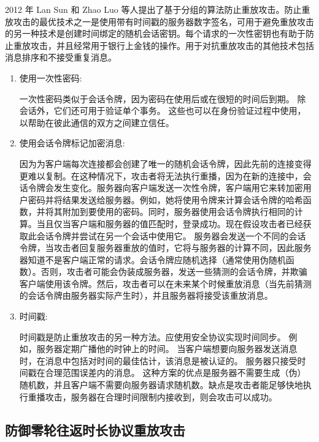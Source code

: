 2012 年 Lan Sun 和 Zhao Luo 等人\cite{6295193}提出了基于分组的算法防止重放攻击。防止重放攻击的最优技术之一是使用带有时间戳的服务器数字签名，可用于避免重放攻击的另一种技术是创建时间绑定的随机会话密钥。每个请求的一次性密钥也有助于防止重放攻击，并且经常用于银行上金钱的操作。用于对抗重放攻击的其他技术包括消息排序和不接受重复消息。
\begin{enumerate}
  \item 使用一次性密码:
  
    一次性密码类似于会话令牌，因为密码在使用后或在很短的时间后到期。 除会话外，它们还可用于验证单个事务。 这些也可以在身份验证过程中使用，以帮助在彼此通信的双方之间建立信任。

  \item 使用会话令牌标记加密消息:
  
    因为为客户端每次连接都会创建了唯一的随机会话令牌，因此先前的连接变得更难以复制。在这种情况下，攻击者将无法执行重播，因为在新的连接中，会话令牌会发生变化。服务器向客户端发送一次性令牌，客户端用它来转加密用户密码并将结果发送给服务器。例如，她将使用令牌来计算会话令牌的哈希函数，并将其附加到要使用的密码。同时，服务器使用会话令牌执行相同的计算。当且仅当客户端和服务器的值匹配时，登录成功。现在假设攻击者已经获取此会话令牌并尝试在另一个会话中使用它。 服务器会发送一个不同的会话令牌，当攻击者回复服务器重放的值时，它将与服务器的计算不同，因此服务器知道不是客户端正常的请求。会话令牌应随机选择（通常使用伪随机函数）。否则，攻击者可能会伪装成服务器，发送一些猜测的会话令牌，并欺骗客户端使用该令牌。然后，攻击者可以在未来某个时候重放消息（当先前猜测的会话令牌由服务器实际产生时），并且服务器将接受该重放消息。

  \item 时间戳:

    时间戳是防止重放攻击的另一种方法。应使用安全协议实现时间同步。 例如，服务器定期广播他的时钟上的时间。 当客户端想要向服务器发送消息时，在消息中包括对时间的最佳估计，该消息是被认证的。 服务器只接受时间戳在合理范围误差内的消息。 这种方案的优点是服务器不需要生成（伪）随机数，并且客户端不需要向服务器请求随机数。缺点是攻击者能足够快地执行重播攻击，服务器在合理时间限制内接收到，则会攻击可以成功。

\end{enumerate}

\subsection{防御零轮往返时长协议重放攻击}


